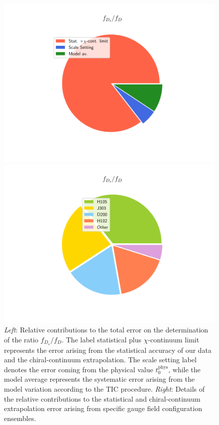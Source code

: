 \begin{figure}[!h]
\begin{center}
\begin{minipage}{.43\linewidth}
\includegraphics[width=\linewidth]{././cap6/figs/fds/error_pie_ratio_fds.pdf}
\end{minipage}
\hspace{15mm}
\begin{minipage}{.4\linewidth}
\includegraphics[width=\linewidth]{././cap6/figs/fds/error_pie_ratio_fds_statonly.pdf}
\end{minipage}
\end{center}
\vspace{-5mm}
	\caption{\textit{Left}: Relative contributions to the total error on the determination of the ratio $f_{D_s}/f_D$. The label statistical plus $\chi$-continuum limit represents the error arising from the statistical accuracy of our data and the chiral-continuum extrapolation. The scale setting label denotes the error coming from the physical value $t_0^{\mathrm{phys}}$, while the model average represents the systematic error arising from the model variation according to the TIC procedure. \textit{Right}: Details of the relative contributions to the statistical and chiral-continuum extrapolation error arising from specific gauge field configuration ensembles. 
          }
	    \label{fig:fds_ratio_error}
\end{figure}

